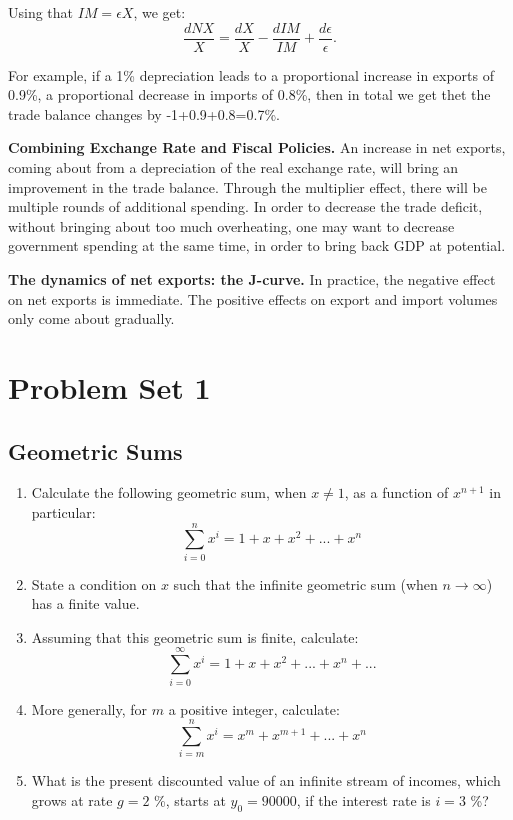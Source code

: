 \documentclass[]{book}
\theoremstyle{definition}
\theoremstyle{definition}
\theoremstyle{definition}
\theoremstyle{remark}
\begin{document}
Using that \(IM=\epsilon X\), we get:
\[\boxed{\frac{dNX}{X}=\frac{dX}{X}-\frac{dIM}{IM}+\frac{d\epsilon}{\epsilon}}.\]

For example, if a 1\% depreciation leads to a proportional increase in
exports of 0.9\%, a proportional decrease in imports of 0.8\%, then in
total we get thet the trade balance changes by -1+0.9+0.8=0.7\%.

\textbf{Combining Exchange Rate and Fiscal Policies.} An increase in net
exports, coming about from a depreciation of the real exchange rate,
will bring an improvement in the trade balance. Through the multiplier
effect, there will be multiple rounds of additional spending. In order
to decrease the trade deficit, without bringing about too much
overheating, one may want to decrease government spending at the same
time, in order to bring back GDP at potential.

\textbf{The dynamics of net exports: the J-curve.} In practice, the
negative effect on net exports is immediate. The positive effects on
export and import volumes only come about gradually.

\appendix


\chapter{Problem Set 1}\label{pset1}

\section{Geometric Sums}\label{geometric-sums}

\begin{enumerate}
\def\labelenumi{\arabic{enumi}.}
\item
  Calculate the following geometric sum, when \(x \neq 1\), as a
  function of \(x^{n+1}\) in particular:
  \[\sum_{i=0}^n x^i = 1+x+x^2+...+x^n\]
\item
  State a condition on \(x\) such that the infinite geometric sum (when
  \(n \to \infty\)) has a finite value.
\item
  Assuming that this geometric sum is finite, calculate:
  \[\sum_{i=0}^{\infty} x^i = 1+x+x^2+...+x^n+...\]
\item
  More generally, for \(m\) a positive integer, calculate:
  \[\sum_{i=m}^n x^i = x^m+x^{m+1}+...+x^n\]
\item
  What is the present discounted value of an infinite stream of incomes,
  which grows at rate \(g=2\) \%, starts at \(y_0=90000\), if the
  interest rate is \(i=3\) \%?
\end{enumerate}
\end{document}
